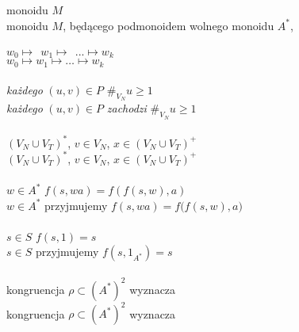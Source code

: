 \documentclass[a4paper,11pt]{article}
\begin{document}
\Jest  monoidu $M$ \\
\Powin monoidu $M$, będącego podmonoidem wolnego monoidu $A^{ * }$, \\
 \\
\Jest  $w_{ 0 } \mapsto \;\, w_{ 1 } \mapsto \;\, ... \mapsto w_{ k }$ \\
\Powin $w_{ 0 } \mapsto w_{ 1 } \mapsto \ldots \mapsto w_{ k }$ \\
 \\
\Jest  \textit{każdego}{ }{ }$( u, v ) \in P${ }{ } $\#_{ V_{ N } } u \geq 1$ \\
\Powin \textit{każdego} $( u, v ) \in P$ \textit{zachodzi}
$\#_{ V_{ N } } u \geq 1$ \\
 \\
\Jest  $( V_{ N } \cup V_{ T } )^{ * }$,{ } $v \in V_{ N }$,{ }
$x \in ( V_{ N } \cup V_{ T } )^{ + }$ \\
\Powin $( V_{ N } \cup V_{ T } )^{ * }$, $v \in V_{ N }$,
$x \in ( V_{ N } \cup V_{ T } )^{ + }$ \\
 \\
\Jest  $w \in A^{ * }${ } $f( s, wa ) = f( f( s, w ), a )$ \\
\Powin $w \in A^{ * }$ przyjmujemy $f( s, wa ) = f\big( f( s, w ), a \big)$ \\
 \\
\Jest  $s \in S${ } $f( s, 1 ) = s$ \\
\Powin $s \in S$ przyjmujemy $f( s, 1_{ A^{ * } } ) = s$ \\
 \\
\Jest  kongruencja{ }{ } $\rho \subset ( A^{ * } )^{ 2 }${ }{ } wyznacza \\
\Powin kongruencja $\rho \subset ( A^{ * } )^{ 2 }$ wyznacza \\




















{}






\end{document}

